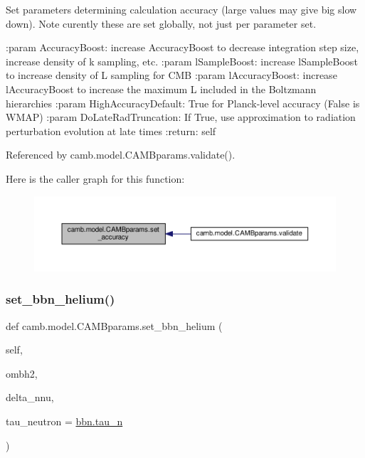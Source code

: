 \begin{DoxyVerb}Set parameters determining calculation accuracy (large values may give big slow down).
Note curently these are set globally, not just per parameter set.

:param AccuracyBoost: increase AccuracyBoost to decrease integration step size, increase density of k sampling, etc.
:param lSampleBoost: increase lSampleBoost to increase density of L sampling for CMB
:param lAccuracyBoost: increase lAccuracyBoost to increase the maximum L included in the Boltzmann hierarchies
:param HighAccuracyDefault: True for Planck-level accuracy (False is WMAP)
:param DoLateRadTruncation: If True, use approximation to radiation perturbation evolution at late times
:return: self
\end{DoxyVerb}
 

Referenced by camb.\+model.\+C\+A\+M\+Bparams.\+validate().

Here is the caller graph for this function\+:
\nopagebreak
\begin{figure}[H]
\begin{center}
\leavevmode
\includegraphics[width=350pt]{classcamb_1_1model_1_1CAMBparams_a05a8e61eca1a78d1f19408dd9530672e_icgraph}
\end{center}
\end{figure}
\mbox{\label{classcamb_1_1model_1_1CAMBparams_a4dba2e237590bea1b9363d9aa0665c03}} 
\subsubsection{\texorpdfstring{set\+\_\+bbn\+\_\+helium()}{set\_bbn\_helium()}}
{\footnotesize\ttfamily def camb.\+model.\+C\+A\+M\+Bparams.\+set\+\_\+bbn\+\_\+helium (\begin{DoxyParamCaption}\item[{}]{self,  }\item[{}]{ombh2,  }\item[{}]{delta\+\_\+nnu,  }\item[{}]{tau\+\_\+neutron = {\ttfamily \mbox{\hyperlink{namespacecamb_1_1bbn_ae95abe1177100ca3b8cfb59cf9e379be}{bbn.\+tau\+\_\+n}}} }\end{DoxyParamCaption})}

